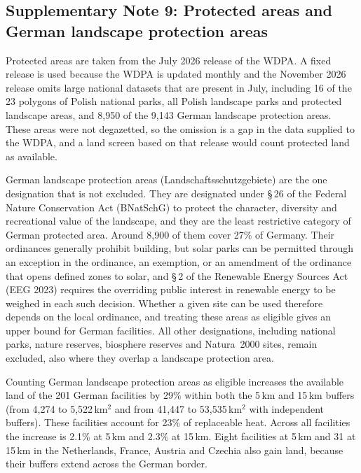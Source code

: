 \documentclass[11pt]{article}
\begin{document}
\subsection*{Supplementary Note 9: Protected areas and German landscape protection areas}
Protected areas are taken from the July 2026 release of the WDPA\cite{wdpa}. A fixed release is used because the WDPA is updated monthly and the November 2026 release omits large national datasets that are present in July, including 16 of the 23 polygons of Polish national parks, all Polish landscape parks and protected landscape areas, and 8,950 of the 9,143 German landscape protection areas. These areas were not degazetted, so the omission is a gap in the data supplied to the WDPA, and a land screen based on that release would count protected land as available.

German landscape protection areas (Landschaftsschutzgebiete) are the one designation that is not excluded. They are designated under \S\,26 of the Federal Nature Conservation Act (BNatSchG) to protect the character, diversity and recreational value of the landscape, and they are the least restrictive category of German protected area. Around 8,900 of them cover 27\% of Germany\cite{keabw2026lsg}. Their ordinances generally prohibit building, but solar parks can be permitted through an exception in the ordinance, an exemption, or an amendment of the ordinance that opens defined zones to solar, and \S\,2 of the Renewable Energy Sources Act (EEG 2023) requires the overriding public interest in renewable energy to be weighed in each such decision\cite{keabw2026lsg}. Whether a given site can be used therefore depends on the local ordinance, and treating these areas as eligible gives an upper bound for German facilities. All other designations, including national parks, nature reserves, biosphere reserves and Natura~2000 sites, remain excluded, also where they overlap a landscape protection area.

Counting German landscape protection areas as eligible increases the available land of the 201 German facilities by 29\% within both the 5\,km and 15\,km buffers (from 4,274 to 5,522\,km$^2$ and from 41,447 to 53,535\,km$^2$ with independent buffers). These facilities account for 23\% of replaceable heat. Across all facilities the increase is 2.1\% at 5\,km and 2.3\% at 15\,km. Eight facilities at 5\,km and 31 at 15\,km in the Netherlands, France, Austria and Czechia also gain land, because their buffers extend across the German border.
\end{document}
